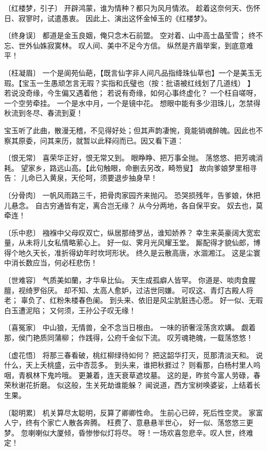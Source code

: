 \documentclass[12pt,oneside]{book}
\begin{document}
〔红楼梦，引子〕
开辟鸿蒙，谁为情种？都只为风月情浓。
趁着这奈何天、伤怀日、寂寥时，试遣愚衷。
因此上、演出这怀金悼玉的《红楼梦》。

〔终身误〕
都道是金玉良姻，俺只念木石前盟。
空对着、山中高士晶莹雪；
终不忘、世外仙姝寂寞林。
叹人间、美中不足今方信。
纵然是齐眉举案，到底意难平！

〔枉凝眉〕
一个是阆苑仙葩，【既言仙字非人间凡品指绛珠仙草也】一个是美玉无瑕。【宝玉一生愚顽怎言无瑕？实指和氏璧也（按：批语被红线划了几道线） 】
若说没奇缘，今生偏又遇着他；
若说有奇缘，如何心事终虚化？
一个枉自嗟呀，一个空劳牵挂。
一个是水中月，一个是镜中花。
想眼中能有多少泪珠儿，怎禁得秋流到冬尽、春流到夏！

宝玉听了此曲，散漫无稽，不见得好处；但其声韵凄惋，竟能销魂醉魄。因此也不察其原委，问其来历，就暂以此释闷而已。因又看下道：

〔恨无常〕
喜荣华正好，恨无常又到。
眼睁睁、把万事全抛。
荡悠悠、把芳魂消耗。
望家乡，路远山高。【此句触眼，命删去另改，畸笏叟】
故向爹娘梦里相寻告：
儿命已入黄泉，天伦呵，须要退步抽身早！

〔分骨肉〕
一帆风雨路三千，把骨肉家园齐来抛闪。
恐哭损残年，告爹娘，休把儿悬念。
自古穷通皆有定，离合岂无缘？
从今分两地，各自保平安。
奴去也，莫牵连！

〔乐中悲〕
襁褓中父母叹双亡，纵居那绮罗丛，谁知娇养？
幸生来英豪阔大宽宏量，从未将儿女私情略萦心上。
好一似、霁月光风耀玉堂。
厮配得才貌仙郎，博得个地久天长，准折得幼年时坎坷形状。
终久是云散高唐，水涸湘江。
这是尘寰中消长数应当，何必枉悲伤！

〔世难容〕
气质美如蘭，才华阜比仙。
天生成孤癖人皆罕。
你道是、啖肉食腥膻，视绮罗俗厌。
却不知、太高人愈妒，过洁世同嫌。
可叹这、青灯古殿人将老；
辜负了、红粉朱楼春色阑。
到头来、依旧是风尘肮脏违心愿。
好一似、无瑕白玉遭泥陷；
又何须，王孙公子叹无缘！

〔喜冤家〕
中山狼，无情兽，全不念当日根由。
一味的骄奢淫荡贪欢媾。
觑着那，侯门艳质同蒲柳；
作践得，公府千金似下流。
叹芳魂艳魄，一载荡悠悠！

〔虚花悟〕
将那三春看破，桃红柳绿待如何？
把这韶华打灭，觅那清淡天和。
说什么，天上夭桃盛，云中杏蕊多。
到头来，谁把秋捱过？
则看那，白杨村里人呜咽，青枫林下鬼吟哦。
更兼着，连天衰草遮坟墓。
这的是，昨贫今富人劳碌，春荣秋谢花折磨。
似这般，生关死劫谁能躲？
闻说道，西方宝树唤婆娑，上结着长生果。

〔聪明累〕
机关算尽太聪明，反算了卿卿性命。
生前心已碎，死后性空灵。
家富人宁，终有个家亡人散各奔腾。
枉费了、意悬悬半世心，
好一似、荡悠悠三更梦。
忽喇喇似大厦倾，昏惨惨似灯将尽。
呀！一场欢喜忽悲辛。叹人世，终难定！
\end{document}
